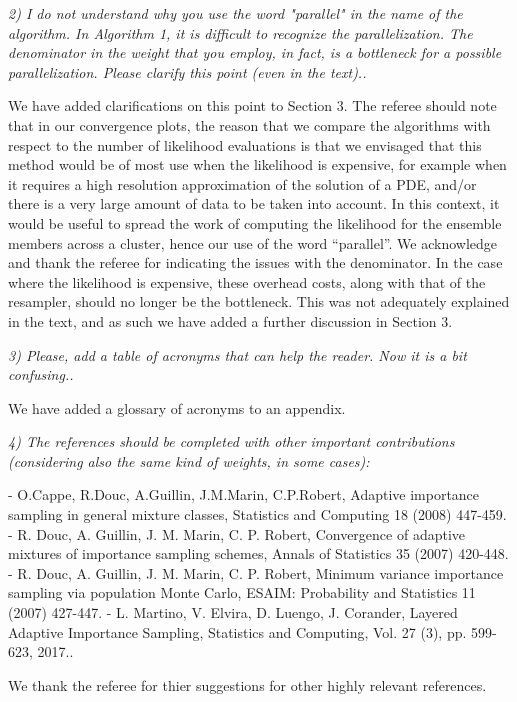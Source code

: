 \documentclass{article}
\newcommand{\comment}[2]{\vspace{0.6cm}{\bf Comment:} {\it #1.}

\vspace{0.3cm}{\bf Answer:} #2}
\begin{document}
\comment{2) I do not understand why you use the word "parallel" in the name of the algorithm. In Algorithm 1, it is difficult to recognize the parallelization. The denominator in the weight that you employ, in fact, is a bottleneck for a possible parallelization. Please clarify this point (even in the text).}{We have added clarifications on this point to Section 3. The referee should note that in our convergence plots, the reason that we compare the algorithms with respect to the number of likelihood evaluations is that we envisaged that this method would be of most use when the likelihood is expensive, for example when it requires a high resolution approximation of the solution of a PDE, and/or there is a very large amount of data to be taken into account. In this context, it would be useful to spread the work of computing the likelihood for the ensemble members across a cluster, hence our use of the word ``parallel''. We acknowledge and thank the referee for indicating the issues with the denominator. In the case where the likelihood is expensive, these overhead costs, along with that of the resampler, should no longer be the bottleneck. This was not adequately explained in the text, and as such we have added a further discussion in Section 3.

}

\comment{3) Please, add a table of acronyms that can help the reader. Now it is a bit confusing.}{We have added a glossary of acronyms to an appendix.} %

\comment{4) The references should be completed with other important contributions (considering also the same kind of weights, in some cases): 

- O.Cappe, R.Douc, A.Guillin, J.M.Marin, C.P.Robert, Adaptive importance sampling in general mixture classes, Statistics and Computing 18 (2008) 447-459. 
- R. Douc, A. Guillin, J. M. Marin, C. P. Robert, Convergence of adaptive mixtures of importance sampling schemes, Annals of Statistics 35 (2007) 420-448. 
- R. Douc, A. Guillin, J. M. Marin, C. P. Robert, Minimum variance importance sampling via population Monte Carlo, ESAIM: Probability and Statistics 11 (2007) 427-447. 
- L. Martino, V. Elvira, D. Luengo, J. Corander, Layered Adaptive Importance Sampling, Statistics and Computing, Vol. 27 (3), pp. 599-623, 2017.}{We thank the referee for thier suggestions for other highly relevant references.} %
\end{document}
